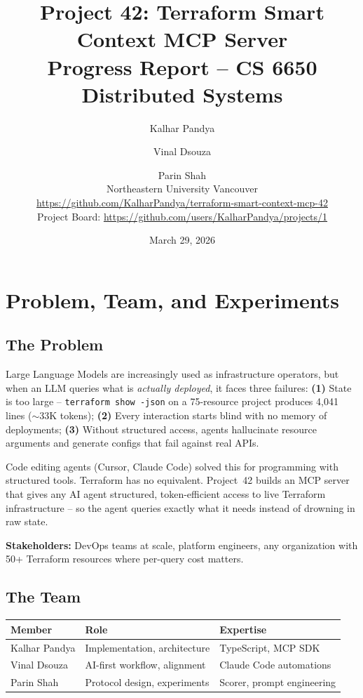 \documentclass[10pt,twocolumn]{article}
\title{\vspace{-1.5cm}\textbf{Project 42: Terraform Smart Context MCP Server}\\[4pt]\large Progress Report -- CS 6650 Distributed Systems}
\author{
  Kalhar Pandya \and Vinal Dsouza \and Parin Shah\\[2pt]
  \small Northeastern University Vancouver\\[2pt]
  \small \url{https://github.com/KalharPandya/terraform-smart-context-mcp-42}\\
  \small Project Board: \url{https://github.com/users/KalharPandya/projects/1}
}
\date{March 29, 2026}
\begin{document}
\maketitle
\vspace{-0.5cm}

\section{Problem, Team, and Experiments}

\subsection{The Problem}

Large Language Models are increasingly used as infrastructure operators, but when an LLM queries what is \textit{actually deployed}, it faces three failures: \textbf{(1)} State is too large -- \texttt{terraform show -json} on a 75-resource project produces 4,041 lines ($\sim$33K tokens); \textbf{(2)} Every interaction starts blind with no memory of deployments; \textbf{(3)} Without structured access, agents hallucinate resource arguments and generate configs that fail against real APIs.

Code editing agents (Cursor, Claude Code) solved this for programming with structured tools. Terraform has no equivalent. Project~42 builds an MCP server that gives any AI agent structured, token-efficient access to live Terraform infrastructure -- so the agent queries exactly what it needs instead of drowning in raw state.

\textbf{Stakeholders:} DevOps teams at scale, platform engineers, any organization with 50+ Terraform resources where per-query cost matters.

\subsection{The Team}

\begin{table}[h]
\centering\small
\begin{tabularx}{\columnwidth}{lXX}
\toprule
\textbf{Member} & \textbf{Role} & \textbf{Expertise} \\
\midrule
Kalhar Pandya & Implementation, architecture & TypeScript, MCP SDK \\
Vinal Dsouza & AI-first workflow, alignment & Claude Code automations \\
Parin Shah & Protocol design, experiments & Scorer, prompt engineering \\
\bottomrule
\end{tabularx}
\end{table}
\end{document}
